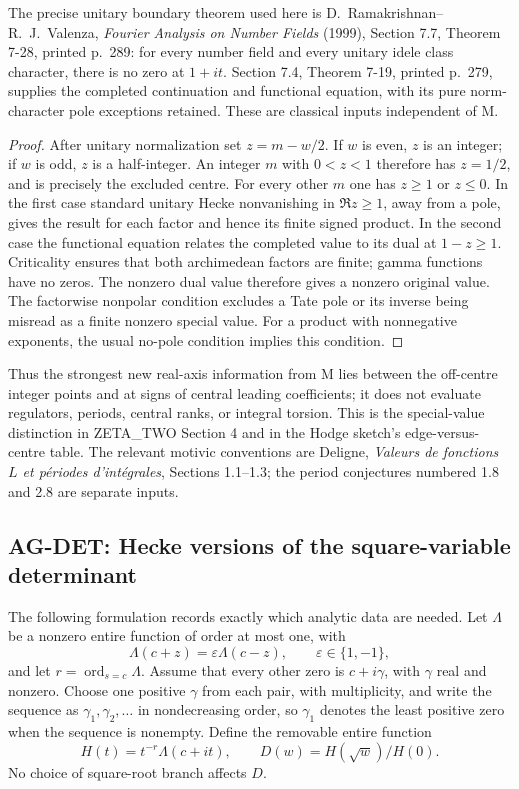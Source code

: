 \documentclass[11pt,a4paper]{article}
\begin{document}
The precise unitary boundary theorem used here is
D.~Ramakrishnan--R.~J.~Valenza, \emph{Fourier Analysis on Number Fields}
(1999), Section 7.7, Theorem 7-28, printed p.~289: for every number
field and every unitary idele class character, there is no zero at
$1+it$. Section 7.4, Theorem 7-19, printed p.~279, supplies the completed
continuation and functional equation, with its pure norm-character pole
exceptions retained. These are classical inputs independent of M.

\begin{proof}
After unitary normalization set $z=m-w/2$. If $w$ is even, $z$ is an
integer; if $w$ is odd, $z$ is a half-integer. An integer $m$ with
$0<z<1$ therefore has $z=1/2$, and is precisely the excluded centre.
For every other $m$ one has $z\ge1$ or $z\le0$. In the first case
standard unitary Hecke nonvanishing in $\Re z\ge1$, away from a pole,
gives the result for each factor and hence its finite signed product.
In the second case the functional equation relates the completed value
to its dual at $1-z\ge1$. Criticality ensures that both archimedean
factors are finite; gamma functions have no zeros. The nonzero dual
value therefore gives a nonzero original value. The factorwise nonpolar
condition excludes a Tate pole or its inverse being misread as a finite
nonzero special value. For a product with nonnegative exponents, the
usual no-pole condition implies this condition.
\end{proof}

Thus the strongest new real-axis information from M lies between the
off-centre integer points and at signs of central leading coefficients;
it does not evaluate regulators, periods, central ranks, or integral
torsion. This is the special-value distinction in ZETA\_TWO Section 4
and in the Hodge sketch's edge-versus-centre table. The relevant motivic
conventions are Deligne, \emph{Valeurs de fonctions $L$ et p\'eriodes
d'int\'egrales}, Sections 1.1--1.3; the period conjectures numbered 1.8
and 2.8 are separate inputs.

\subsection{AG-DET: Hecke versions of the square-variable determinant}
\label{ag:det}

The following formulation records exactly which analytic data are needed.
Let $\Lambda$ be a nonzero entire function of order at most one, with
\[
 \Lambda(c+z)=\varepsilon\Lambda(c-z),\qquad
 \varepsilon\in\{1,-1\},
\]
and let $r=\operatorname{ord}_{s=c}\Lambda$. Assume that every other zero
is $c+i\gamma$, with $\gamma$ real and nonzero. Choose one positive
$\gamma$ from each pair, with multiplicity, and write the sequence as
$\gamma_1,\gamma_2,\ldots$ in nondecreasing order, so $\gamma_1$
denotes the least positive zero when the sequence is nonempty.
Define the removable entire function
\[
 H(t)=t^{-r}\Lambda(c+it),\qquad
 D(w)=H(\sqrt w)/H(0).
\]
No choice of square-root branch affects $D$.
\end{document}
